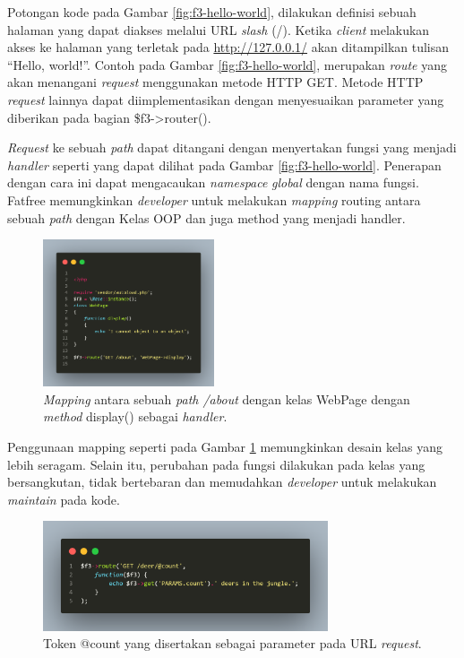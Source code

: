 \documentclass[a4paper,twoside]{article}
\begin{document}
\begin{enumerate}
		Potongan kode pada Gambar \ref{fig:f3-hello-world}, dilakukan definisi sebuah halaman yang dapat diakses melalui URL \textit{slash} (/). Ketika \textit{client} melakukan akses ke halaman yang terletak pada \url{http://127.0.0.1/} akan ditampilkan tulisan ``Hello, world!''. Contoh pada Gambar \ref{fig:f3-hello-world}, merupakan \textit{route} yang akan menangani \textit{request} menggunakan metode HTTP GET. Metode HTTP \textit{request} lainnya dapat diimplementasikan dengan menyesuaikan parameter yang diberikan pada bagian \$f3->router().
		
		\textit{Request} ke sebuah \textit{path} dapat ditangani dengan menyertakan fungsi yang menjadi \textit{handler} seperti yang dapat dilihat pada Gambar \ref{fig:f3-hello-world}. Penerapan dengan cara ini dapat mengacaukan \textit{namespace} \textit{global} dengan nama fungsi. Fatfree memungkinkan \textit{developer} untuk melakukan \textit{mapping} routing antara sebuah \textit{path} dengan Kelas OOP dan juga method yang menjadi handler. 
		
			 \begin{figure}[H]
            \centering
            \includegraphics[width=0.45\textwidth]{images/hello-world-oop.png}
            \caption{\textit{Mapping} antara sebuah \textit{path /about} dengan kelas WebPage dengan \textit{method} display() sebagai \textit{handler}.}
            \label{fig:f3-hello-world-oop}
        \end{figure}
        
        Penggunaan mapping seperti pada Gambar \ref{fig:f3-hello-world-oop} memungkinkan desain kelas yang lebih seragam. Selain itu, perubahan pada fungsi dilakukan pada kelas yang bersangkutan, tidak bertebaran dan memudahkan \textit{developer} untuk melakukan \textit{maintain} pada kode.  
        
        
		\begin{figure}[H]
            \centering
            \includegraphics[width=0.75\textwidth]{images/route-beer-param.png}
            \caption{Token @count yang disertakan sebagai parameter pada URL \textit{request}.}
            \label{fig:route-beer-param}
        \end{figure}
        

\end{enumerate}
\end{document}
